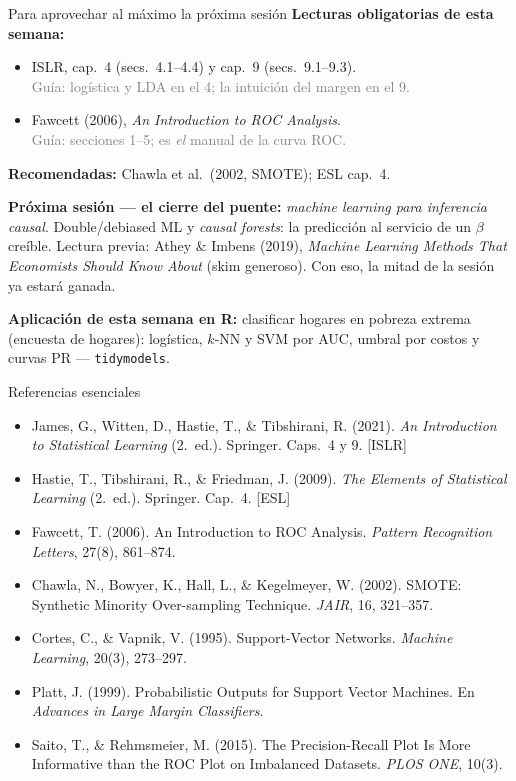 \documentclass{beamer}
\newcommand{\1}{\mathbb{I}}
\begin{document}
\begin{frame}{Para aprovechar al máximo la próxima sesión}
\small
\textbf{Lecturas obligatorias de esta semana:}
\begin{itemize}\itemsep4pt
  \item ISLR, cap.\ 4 (secs.\ 4.1--4.4) y cap.\ 9 (secs.\ 9.1--9.3). \\ \textcolor{gray}{Guía: logística y LDA en el 4; la intuición del margen en el 9.}
  \item Fawcett (2006), \emph{An Introduction to ROC Analysis}. \\ \textcolor{gray}{Guía: secciones 1--5; es \emph{el} manual de la curva ROC.}
\end{itemize}

\textbf{Recomendadas:} Chawla et al.\ (2002, SMOTE); ESL cap.\ 4.
\pause

\vspace{0.2cm}
\textbf{Próxima sesión --- el cierre del puente:} \emph{machine learning para inferencia causal}. Double/debiased ML y \emph{causal forests}: la predicción al servicio de un $\beta$ creíble. Lectura previa: Athey \& Imbens (2019), \emph{Machine Learning Methods That Economists Should Know About} (skim generoso). Con eso, la mitad de la sesión ya estará ganada.
\pause

\vspace{0.2cm}
\textbf{Aplicación de esta semana en R:} clasificar hogares en pobreza extrema (encuesta de hogares): logística, $k$-NN y SVM por AUC, umbral por costos y curvas PR --- \texttt{tidymodels}.
\end{frame}

\begin{frame}{Referencias esenciales}
\footnotesize
\begin{itemize}\itemsep2pt
  \item James, G., Witten, D., Hastie, T., \& Tibshirani, R. (2021). \emph{An Introduction to Statistical Learning} (2.\ ed.). Springer. Caps.\ 4 y 9. [ISLR]
  \item Hastie, T., Tibshirani, R., \& Friedman, J. (2009). \emph{The Elements of Statistical Learning} (2.\ ed.). Springer. Cap.\ 4. [ESL]
  \item Fawcett, T. (2006). An Introduction to ROC Analysis. \emph{Pattern Recognition Letters}, 27(8), 861--874.
  \item Chawla, N., Bowyer, K., Hall, L., \& Kegelmeyer, W. (2002). SMOTE: Synthetic Minority Over-sampling Technique. \emph{JAIR}, 16, 321--357.
  \item Cortes, C., \& Vapnik, V. (1995). Support-Vector Networks. \emph{Machine Learning}, 20(3), 273--297.
  \item Platt, J. (1999). Probabilistic Outputs for Support Vector Machines. En \emph{Advances in Large Margin Classifiers}.
  \item Saito, T., \& Rehmsmeier, M. (2015). The Precision-Recall Plot Is More Informative than the ROC Plot on Imbalanced Datasets. \emph{PLOS ONE}, 10(3).
\end{itemize}
\normalsize
\end{frame}

\end{document}
